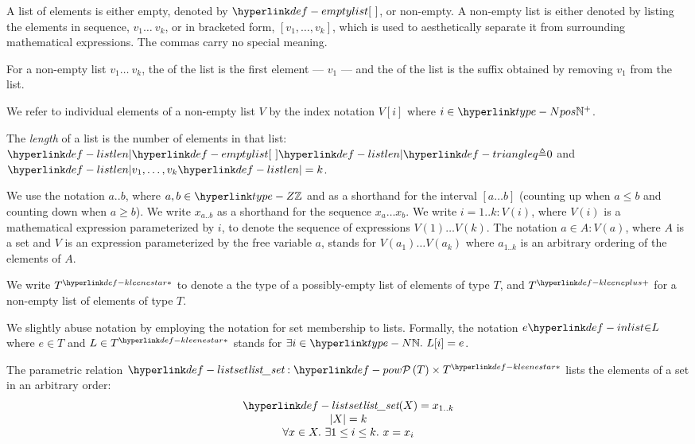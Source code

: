 A list of elements \hypertarget{def-emptylist}{is either empty, denoted by $\emptylist$}, or non-empty.
A non-empty list is either denoted by listing the elements in sequence, $v_1 \ldots\ v_k$,
or in bracketed form, $[v_1,\ldots,v_k]$, which is used to aesthetically separate it from surrounding mathematical expressions.
The commas carry no special meaning.

\hypertarget{def-head}{}
\hypertarget{def-tail}{}
For a non-empty list $v_1 \ldots\ v_k$, the \emph{\head} of the list is the first element --- $v_1$ ---
and the \emph{\tail} of the list is the suffix obtained by removing $v_1$ from the list.

We refer to individual elements of a non-empty list $V$ by the index notation $V[i]$ where $i\in\Npos$.

\hypertarget{def-listlen}{}
\begin{definition}
The \emph{length} of a list is the number of elements in that list:
$\listlen{\emptylist} \triangleq 0$ and $\listlen{v_1,\ldots,v_k}=k$.
\end{definition}

We use the notation $a..b$, where $a,b\in\Z$ and as a shorthand for the interval $[a\ldots b]$
(counting up when $a \leq b$ and counting down when $a \geq b$).
We write $x_{a..b}$ as a shorthand for the sequence $x_a \ldots x_b$.
%
We write $i=1..k: V(i)$, where $V(i)$ is a mathematical expression parameterized by $i$,
to denote the sequence of expressions $V(1) \ldots V(k)$.
The notation $a \in A: V(a)$, where $A$ is a set and $V$ is an expression parameterized by the free variable $a$,
stands for $V(a_1) \ldots V(a_k)$ where $a_{1..k}$ is an arbitrary ordering of the elements of $A$.

\hypertarget{def-kleenestar}{}
\hypertarget{def-kleeneplus}{}
We write $\KleeneStar{T}$ to denote a the type of a possibly-empty list of elements of type $T$,
and $\KleenePlus{T}$ for a non-empty list of elements of type $T$.

\hypertarget{def-inlist}{}
We slightly abuse notation by employing the notation for set membership to lists.
Formally, the notation $e \inlist L$ where $e \in T$ and $L \in \KleeneStar{T}$ stands for $\exists i\in\N.\ L[i]=e$.

\hypertarget{def-listset}{}
\begin{definition}
The parametric relation $\listset : \pow{T} \times \KleeneStar{T}$
lists the elements of a set in an arbitrary order:
\[
\begin{array}{c}
  \listset(X) = x_{1..k}\\
  |X| = k\\
  \forall x\in X.\ \exists 1 \leq i \leq k.\ x = x_i
\end{array}
\]
\end{definition}

